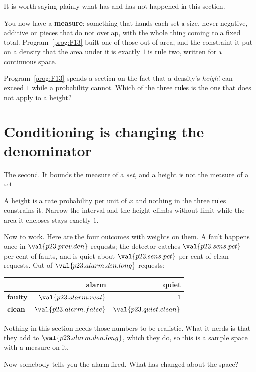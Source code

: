 \begin{fr}
It is worth saying plainly what has and has not happened in this section.

You now have a \textbf{measure}: something that hands each set a size, never
negative, additive on pieces that do not overlap, with the whole thing coming
to a fixed total. Program~\ref{prog:F13} built one of those out of area, and
the constraint it put on a density \dash{} that the area under it is exactly
$1$ \dash{} is rule two, written for a continuous space.


Program~\ref{prog:F13} spends a section on the fact that a density's
\emph{height} can exceed $1$ while a probability cannot. Which of the three
rules is the one that does not apply to a height?
\dotline
\nextframe
\end{fr}

\section{Conditioning is changing the denominator}
\label{sec:P23-conditioning}

\begin{fr}
\begin{ansblock}
The second. It bounds the measure of a \emph{set}, and a height is not the
measure of a set.
\end{ansblock}

A height is a rate \dash{} probability per unit of $x$ \dash{} and nothing in
the three rules constrains it. Narrow the interval and the height climbs
without limit while the area it encloses stays exactly $1$.

Now to work. Here are the four outcomes with weights on them. A fault happens once in
$\val{p23.prev.den}$ requests; the detector catches $\val{p23.sens.pct}$ per
cent of faults, and is quiet about $\val{p23.sens.pct}$ per cent of clean
requests. Out of $\val{p23.alarm.den.long}$ requests:

\begin{center}
\begin{tabular}{lrr}
\toprule
& \textbf{alarm} & \textbf{quiet} \\
\midrule
\textbf{faulty} & $\val{p23.alarm.real}$ & $1$ \\
\textbf{clean}  & $\val{p23.alarm.false}$ & $\val{p23.quiet.clean}$ \\
\bottomrule
\end{tabular}
\end{center}

Nothing in this section needs those numbers to be realistic. What it needs is
that they add to $\val{p23.alarm.den.long}$, which they do, so this is a sample
space with a measure on it.

Now somebody tells you the alarm fired. What has changed about the space?
\dotline
\nextframe
\end{fr}

